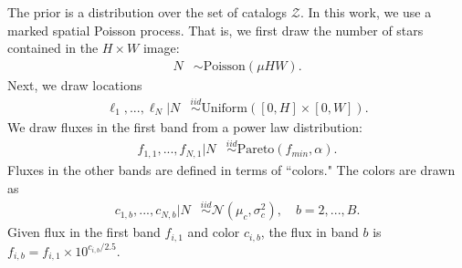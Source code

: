 The prior is a distribution over the set of catalogs $\mathcal{Z}$. In this work, we use a marked spatial Poisson process. That is, we first draw the number of stars contained in the $H\times W$ image:
\begin{align}
	N &\sim \text{Poisson}(\mu HW).
\end{align}
Next, we draw locations
\begin{align}
  \ell_1, ..., \ell_N | N &\stackrel{iid}{\sim} \text{Uniform}([0, H] \times [0, W]). 
 \end{align}
We draw fluxes in the first band from a power law distribution:
\begin{align}
    f_{1, 1}, ..., f_{N,1} | N & 
    \stackrel{iid}{\sim} \text{Pareto}(f_{min}, \alpha) 
    \label{eq:flux_prior}.
\end{align}
Fluxes in the other bands are defined in terms of ``colors." The colors are drawn as
\begin{align}
  c_{1, b}, ..., c_{N,b} | N  & 
      \stackrel{iid}{\sim} \mathcal{N}(\mu_c, \sigma^2_c), \quad b = 2, ..., B.
\end{align}
Given flux in the first band $f_{i,1}$ and color $c_{i,b}$,
the flux in band $b$ is  $f_{i,b} = f_{i,1} \times 10^{c_{i,b} / 2.5}$.




